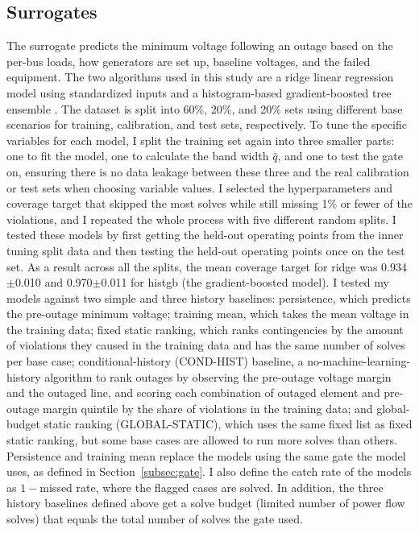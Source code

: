 \documentclass[12pt]{article}
\begin{document}
\subsection{Surrogates}\label{subsec:surrogates}

The surrogate predicts the minimum voltage following an outage based on the per-bus loads, how generators are set up, baseline voltages, and the failed equipment. The two algorithms used in this study are a ridge linear regression model using standardized inputs and a histogram-based gradient-boosted tree ensemble \cite{sklearn}. The dataset is split into 60\%, 20\%, and 20\% sets using different base scenarios for training, calibration, and test sets, respectively. To tune the specific variables for each model, I split the training set again into three smaller parts: one to fit the model, one to calculate the band width $\hat{q}$, and one to test the gate on, ensuring there is no data leakage between these three and the real calibration or test sets when choosing variable values. I selected the hyperparameters and coverage target that skipped the most solves while still missing 1\% or fewer of the violations, and I repeated the whole process with five different random splits. I tested these models by first getting the held-out operating points from the inner tuning split data and then testing the held-out operating points once on the test set. As a result across all the splits, the mean coverage target for ridge was 0.934$\pm$0.010 and 0.970$\pm$0.011 for histgb (the gradient-boosted model). I tested my models against two simple and three history baselines: persistence, which predicts the pre-outage minimum voltage; training mean, which takes the mean voltage in the training data; fixed static ranking, which ranks contingencies by the amount of violations they caused in the training data and has the same number of solves per base case; conditional-history (COND-HIST) baseline, a no-machine-learning-history algorithm to rank outages by observing the pre-outage voltage margin and the outaged line, and scoring each combination of outaged element and pre-outage margin quintile by the share of violations in the training data; and global-budget static ranking (GLOBAL-STATIC), which uses the same fixed list as fixed static ranking, but some base cases are allowed to run more solves than others. Persistence and training mean replace the models using the same gate the model uses, as defined in Section~\ref{subsec:gate}. I also define the catch rate of the models as $1-{}$missed rate, where the flagged cases are solved. In addition, the three history baselines defined above get a solve budget (limited number of power flow solves) that equals the total number of solves the gate used.
\end{document}
